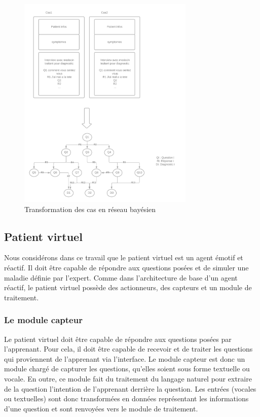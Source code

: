     
    \begin{figure}[H]
        \includegraphics[width=0.75\textwidth]{figures/Trans base cas-reseau bayesien.png}
        \captionsetup{justification=centering}
        \caption{Transformation des cas en réseau bayésien}
        \label{fig:4}
    \end{figure}
    
    \subsection{Patient virtuel}
    Nous considérons dans ce travail que le patient virtuel est un agent émotif et réactif. Il doit être capable de répondre aux questions posées et de simuler une maladie définie par l'expert.
    Comme dans l'architecture de base d'un agent réactif, le patient virtuel possède des actionneurs, des capteurs et un module de traitement.
    
    \subsubsection{Le module capteur}
    Le patient virtuel doit être capable de répondre aux questions posées par l'apprenant. Pour cela, il doit être capable de recevoir et de traiter les questions qui proviennent de l'apprenant via l'interface.
    Le module capteur est donc un module chargé de capturer les questions, qu'elles soient sous forme textuelle ou vocale. En outre, ce module fait du traitement du langage naturel pour extraire de la question l'intention de l'apprenant derrière la question. Les entrées (vocales ou textuelles) sont donc transformées en données représentant les informations d'une question et sont renvoyées vers le module de traitement.
    
